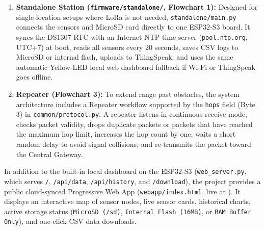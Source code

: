 \documentclass[conference,onecolumn]{IEEEtran}
\begin{document}
\begin{enumerate}
\begin{itemize}
        \item \textit{Cloud and Failover Web Task:} When Wi-Fi is connected (\textbf{Online Mode}, Solid Green LED), the gateway uploads new sensor data to ThingSpeak every 20 seconds (Channel \texttt{3543024} for Node 1 and Channel \texttt{3558474} for Node 2) while keeping the local web server off to save memory. If Wi-Fi fails at boot, the gateway starts a local Wi-Fi hotspot (\texttt{WeatherStation-ESP32} at \texttt{192.168.4.1}) with a captive portal DNS server (\texttt{dns\_server.py}) and local web dashboard (\texttt{web\_server.py}, Solid Yellow LED). Similarly, if ThingSpeak fails 3 times in a row during normal operation, the gateway automatically opens the local web dashboard at \texttt{http://<local\_ip>/} (Solid Yellow LED) and retries ThingSpeak every 60 seconds, switching back to Online Mode (Solid Green LED) once the cloud connection recovers.
    \end{itemize}
    \item \textbf{Standalone Station (\texttt{firmware/standalone/}, Flowchart 1):} Designed for single-location setups where LoRa is not needed, \texttt{standalone/main.py} connects the sensors and MicroSD card directly to one ESP32-S3 board. It syncs the DS1307 RTC with an Internet NTP time server (\texttt{pool.ntp.org}, UTC+7) at boot, reads all sensors every 20 seconds, saves CSV logs to MicroSD or internal flash, uploads to ThingSpeak, and uses the same automatic Yellow-LED local web dashboard fallback if Wi-Fi or ThingSpeak goes offline.
    \item \textbf{Repeater (Flowchart 3):} To extend range past obstacles, the system architecture includes a Repeater workflow supported by the \texttt{hops} field (Byte 3) in \texttt{common/protocol.py}. A repeater listens in continuous receive mode, checks packet validity, drops duplicate packets or packets that have reached the maximum hop limit, increases the hop count by one, waits a short random delay to avoid signal collisions, and re-transmits the packet toward the Central Gateway.
\end{enumerate}

In addition to the built-in local dashboard on the ESP32-S3 (\texttt{web\_server.py}, which serves \texttt{/}, \texttt{/api/data}, \texttt{/api/history}, and \texttt{/download}), the project provides a public cloud-synced Progressive Web App (\texttt{webapp/index.html}, live at \href{https://weather.iimarky123.io.vn/}{\textbf{\pwaurl}}). It displays an interactive map of sensor nodes, live sensor cards, historical charts, active storage status (\texttt{MicroSD (/sd)}, \texttt{Internal Flash (16MB)}, or \texttt{RAM Buffer Only}), and one-click CSV data downloads.
\end{document}
